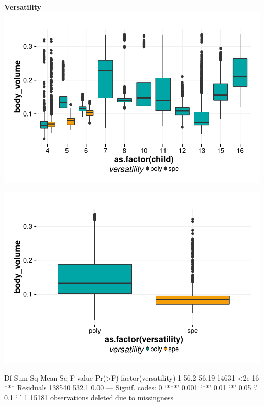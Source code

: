 \documentclass{article}
\begin{document}
\textbf{Versatility}
\includegraphics{features-plot_body_volume_child_versatility_quiz}

\includegraphics{features-plot_body_volume_gender_quiz}

\begin{Schunk}
\begin{Soutput}
                        Df Sum Sq Mean Sq F value Pr(>F)    
factor(versatility)      1   56.2   56.19   14631 <2e-16 ***
Residuals           138540  532.1    0.00                   
---
Signif. codes:  0 ‘***’ 0.001 ‘**’ 0.01 ‘*’ 0.05 ‘.’ 0.1 ‘ ’ 1
15181 observations deleted due to missingness
\end{Soutput}
\end{Schunk}
\end{document}

